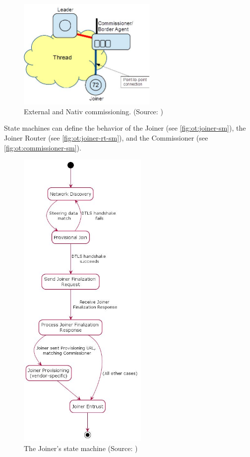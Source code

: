 \begin{figure}[!ht]
	\includegraphics[width=67mm, keepaspectratio]{figures/native2-Final_12639Thread_1.3.jpg}
	\caption{External and Nativ commissioning. (Source: \cite{thread:130})}
	\label{fig:ot:commissioning}
\end{figure}


State machines can define the behavior of the Joiner (see \autoref{fig:ot:joiner-sm}),
the Joiner Router (see \autoref{fig:ot:joiner-rt-sm}), and the Commissioner (see \autoref{fig:ot:commissioner-sm}).

\begin{figure}[!ht]
    \centering
    \includegraphics[height=150mm, keepaspectratio]{figures/joiner-sm-Final_12639Thread_1.3.jpg}
    \caption{The Joiner's state machine (Source: \cite{thread:130})}
    \label{fig:ot:joiner-sm}
\end{figure}

